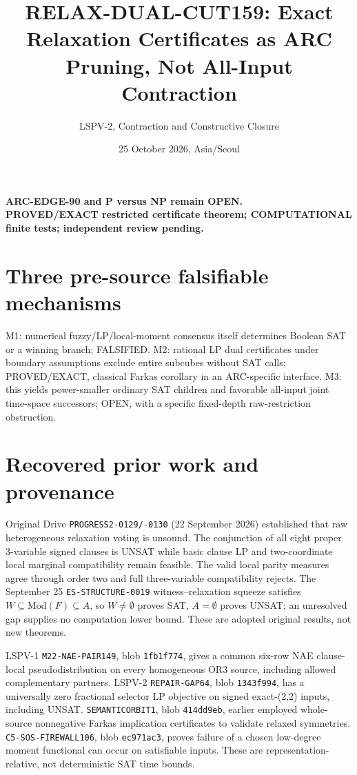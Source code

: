 \documentclass[11pt]{article}
\title{RELAX-DUAL-CUT159: Exact Relaxation Certificates as ARC Pruning, Not All-Input Contraction}
\author{LSPV-2, Contraction and Constructive Closure}
\date{25 October 2026, Asia/Seoul}
\begin{document}
\maketitle
\begin{center}\textbf{ARC-EDGE-90 and P versus NP remain OPEN.}\\
\textbf{PROVED/EXACT restricted certificate theorem; COMPUTATIONAL finite tests; independent review pending.}\end{center}

\section{Three pre-source falsifiable mechanisms}
M1: numerical fuzzy/LP/local-moment consensus itself determines Boolean SAT or a winning branch; FALSIFIED. M2: rational LP dual certificates under boundary assumptions exclude entire subcubes without SAT calls; PROVED/EXACT, classical Farkas corollary in an ARC-specific interface. M3: this yields power-smaller ordinary SAT children and favorable all-input joint time-space successors; OPEN, with a specific fixed-depth raw-restriction obstruction.

\section{Recovered prior work and provenance}
Original Drive \texttt{PROGRESS2-0129/-0130} (22 September 2026) established that raw heterogeneous relaxation voting is unsound. The conjunction of all eight proper 3-variable signed clauses is UNSAT while basic clause LP and two-coordinate local marginal compatibility remain feasible. The valid local parity measures agree through order two and full three-variable compatibility rejects. The September 25 \texttt{ES-STRUCTURE-0019} witness--relaxation squeeze satisfies $W\subseteq\mathrm{Mod}(F)\subseteq A$, so $W\ne\emptyset$ proves SAT, $A=\emptyset$ proves UNSAT; an unresolved gap supplies no computation lower bound. These are adopted original results, not new theorems.

LSPV-1 \texttt{M22-NAE-PAIR149}, blob \texttt{1fb1f774}, gives a common six-row NAE clause-local pseudodistribution on every homogeneous OR3 source, including allowed complementary partners. LSPV-2 \texttt{REPAIR-GAP64}, blob \texttt{1343f994}, has a universally zero fractional selector LP objective on signed exact-(2,2) inputs, including UNSAT. \texttt{SEMANTICORBIT1}, blob \texttt{414dd9eb}, earlier employed whole-source nonnegative Farkas implication certificates to validate relaxed symmetries. \texttt{C5-SOS-FIREWALL106}, blob \texttt{ec971ac3}, proves failure of a chosen low-degree moment functional can occur on satisfiable inputs. These are representation-relative, not deterministic SAT time bounds.
\end{document}
